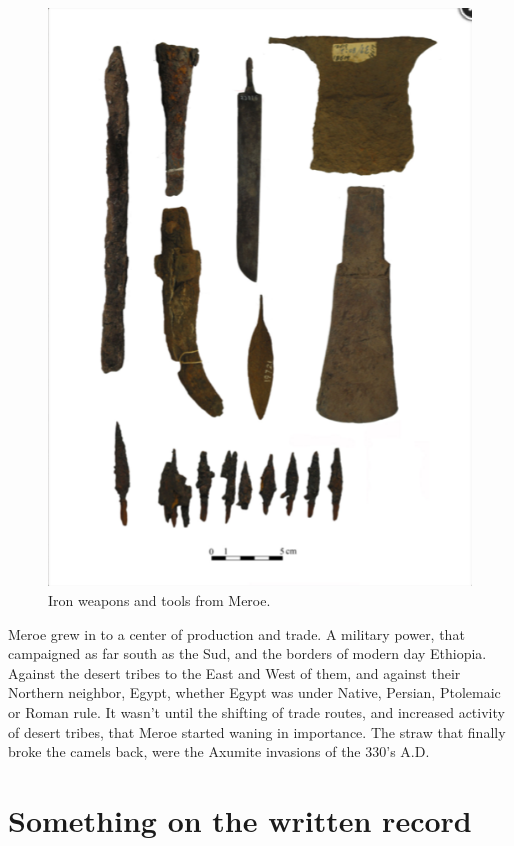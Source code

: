 \documentclass[a4paper,12pt]{scrreprt}
\begin{document}
\begin{figure}[H]
	\centering
	\includegraphics[width=\textwidth]{img/iron_weapons_and_tools}
	\caption{Iron weapons and tools from Meroe.}
\end{figure}

Meroe grew in to a center of production and trade. A military power, that campaigned as far south as the Sud, and the borders of modern day Ethiopia. Against the desert tribes to the East and West of them, and against their Northern neighbor, Egypt, whether Egypt was under Native, Persian, Ptolemaic or Roman rule. It wasn’t until the shifting of trade routes, and increased activity of desert tribes, that Meroe started waning in importance. The straw that finally broke the camels back, were the Axumite invasions of the 330’s A.D. 

\section{Something on the written record}
\end{document}
